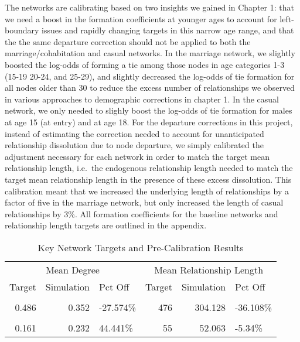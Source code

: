 \documentclass [11pt, proquest] {uwthesis}[2015/03/03]
\begin{document}
The networks are calibrating based on two insights we gained in Chapter 1: that we need a boost in the formation coefficients at younger ages to account for left-boundary issues and rapidly changing targets in this narrow age range, and that the the same departure correction should not be applied to both the marriage/cohabitation and casual networks. In the marriage network, we slightly boosted the log-odds of forming a tie among those nodes in age categories 1-3 (15-19 20-24, and 25-29), and slightly decreased the log-odds of tie formation for all nodes older than 30 to reduce the excess number of relationships we observed in various approaches to demographic corrections in chapter 1. In the casual network, we only needed to slighly boost the log-odds of tie formation for males at age 15 (at entry) and at age 18. For the departure corrections in this project, instead of estimating the correction needed to account for unanticipated relationship dissolution due to node departure, we simply calibrated the adjustment necessary for each network in order to match the target mean relationship length, i.e.~the endogenous relationship length needed to match the target mean relationship length in the presence of these excess dissolution. This calibration meant that we increased the underlying length of relationships by a factor of five in the marriage network, but only increased the length of casual relationships by 3\%. All formation coefficients for the baseline networks and relationship length targets are outlined in the appendix.
\begin{table}

\caption{\label{tab:net-uncalib}Key Network Targets and Pre-Calibration Results}
\centering
\begin{tabular}[t]{rrlrrl}
\toprule
\multicolumn{3}{c}{Mean Degree} & \multicolumn{3}{c}{Mean Relationship Length} \\
\cmidrule(l{3pt}r{3pt}){1-3} \cmidrule(l{3pt}r{3pt}){4-6}
Target & Simulation & Pct Off & Target & Simulation & Pct Off\\
\midrule
\addlinespace[0.3em]
\multicolumn{6}{l}{\textbf{Marriage/Cohabitation Network}}\\
\hspace{1em}0.486 & 0.352 & -27.574\% & 476 & 304.128 & -36.108\%\\
\addlinespace[0.3em]
\multicolumn{6}{l}{\textbf{Casual Network}}\\
\hspace{1em}0.161 & 0.232 & 44.441\% & 55 & 52.063 & -5.34\%\\
\bottomrule
\end{tabular}
\end{table}
\end{document}

